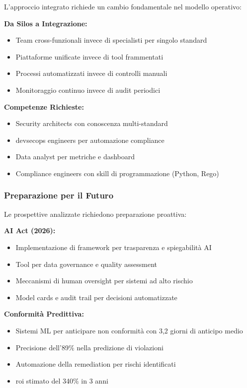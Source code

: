 L'approccio integrato richiede un cambio fondamentale nel modello operativo:

\textbf{Da Silos a Integrazione:}
\begin{itemize}
    \item Team cross-funzionali invece di specialisti per singolo standard
    \item Piattaforme unificate invece di tool frammentati
    \item Processi automatizzati invece di controlli manuali
    \item Monitoraggio continuo invece di audit periodici
\end{itemize}

\textbf{Competenze Richieste:}
\begin{itemize}
    \item Security architects con conoscenza multi-standard
    \item \gls{devsecops} engineers per automazione compliance
    \item Data analyst per metriche e dashboard
    \item Compliance engineers con skill di programmazione (Python, Rego)
\end{itemize}

\subsubsection{\texorpdfstring{Preparazione per il Futuro}{4.9.3.2 - Preparazione per il Futuro}}

Le prospettive analizzate richiedono preparazione proattiva:

\textbf{AI Act (2026):}
\begin{itemize}
    \item Implementazione di framework per trasparenza e spiegabilità AI
    \item Tool per data governance e quality assessment
    \item Meccanismi di human oversight per sistemi ad alto rischio
    \item Model cards e audit trail per decisioni automatizzate
\end{itemize}

\textbf{Conformità Predittiva:}
\begin{itemize}
    \item Sistemi ML per anticipare non conformità con 3,2 giorni di anticipo medio
    \item Precisione dell'89\% nella predizione di violazioni
    \item Automazione della remediation per rischi identificati
    \item \gls{roi} stimato del 340\% in 3 anni
\end{itemize}

